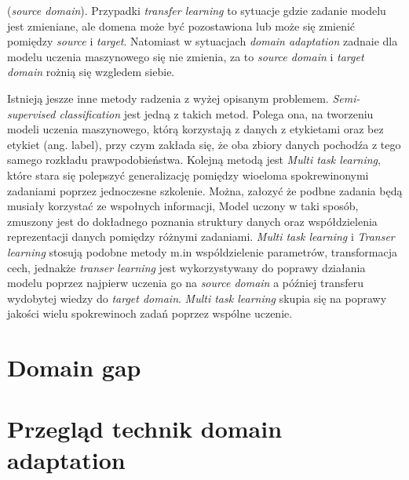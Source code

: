         (\textit{source domain}). Przypadki \textit{transfer learning} to sytuacje gdzie zadanie modelu jest zmieniane, ale domena może być pozostawiona lub może
        się zmienić pomiędzy \textit{source} i \textit{target}. Natomiast w sytuacjach \textit{domain adaptation} zadnaie dla modelu uczenia maszynowego się 
        nie zmienia, za to \textit{source domain} i \textit{target domain} rożnią się wzgledem siebie. \par
            Istnieją jeszze inne metody radzenia z wyżej opisanym problemem. \textit{Semi-supervised classification}\cite{semi-sup-learning} jest jedną z takich 
        metod. Polega ona, na tworzeniu modeli uczenia maszynowego, którą korzystają z danych z etykietami oraz bez etykiet (ang. label), przy czym zakłada się, 
        że oba zbiory danych pochodźa z tego samego rozkładu prawpodobieństwa. Kolejną metodą jest \textit{Multi task learning}\cite{multitask-learning}, które
        stara się polepszyć generalizację pomiędzy wioeloma spokrewinonymi zadaniami poprzez jednoczesne szkolenie. Można, załozyć że podbne zadania będą 
        musiały korzystać ze wspołnych informacji, Model uczony w taki sposób, zmuszony jest do dokładnego poznania struktury danych oraz współdzielenia 
        reprezentacji danych pomiędzy różnymi zadaniami. \textit{Multi task learning} i \textit{Transer learning} stosują podobne metody m.in wspóldzielenie 
        parametrów, transformacja cech, jednakże \textit{transer learning} jest wykorzystywany do poprawy działania modelu poprzez najpierw uczenia go na 
        \textit{source domain} a później transferu wydobytej wiedzy do \textit{target domain}. \textit{Multi task learning} skupia się na poprawy jakości 
        wielu spokrewinoch zadań poprzez wspólne uczenie.
         \pagebreak 
    \section{Domain gap}
        \pagebreak
    \section{Przegląd technik domain adaptation}
        \pagebreak
